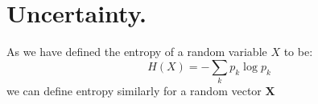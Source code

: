 
\section{Uncertainty.}

As we have defined the entropy of a random variable $X$ to be:
    \begin{equation}
        H(X)=-\sum_{k} p_k \log{p_k}
    \end{equation}
    we can define entropy similarly for a random vector $\textbf{X}$
